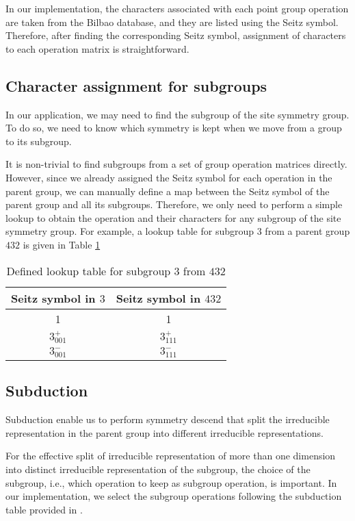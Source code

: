 \documentclass{article}
\begin{document}
In our implementation, the characters associated with each point group operation are taken from the Bilbao database, and 
they are listed using the Seitz symbol. Therefore, after finding the corresponding Seitz symbol, assignment of characters to 
each operation matrix is straightforward.


\subsection{Character assignment for subgroups}

In our application, we may need to find the subgroup of the site symmetry group. 
To do so, we need to know which symmetry is kept when we move from a group to its subgroup. 

It is non-trivial to find subgroups from a set of group operation matrices directly. However, since we 
already assigned the Seitz symbol for each operation in the parent group, we can manually define a 
map between the Seitz symbol of the parent group and all its subgroups. Therefore, we only need 
to perform a simple lookup to obtain the operation and their characters for any subgroup of the site symmetry group. 
For example, a lookup table for subgroup $3$ from a parent group $432$ is given in Table \ref{T:subgrouplookup}

\begin{table}[h]
    \centering
    \caption{Defined lookup table for subgroup $3$ from $432$}
    \begin{tabular}{|c|c|}
        \hline
        Seitz symbol in $3$ & Seitz symbol in $432$\\
        \hline
        1 & 1 \\
        $3^{+}_{001}$ & $3^{+}_{111}$ \\
        $3^{-}_{001}$ & $3^{-}_{111}$ \\
        \hline
    \end{tabular}
    \label{T:subgrouplookup}
\end{table}

\subsection{Subduction}
Subduction enable us to perform symmetry descend that split the irreducible representation 
in the parent group into different irreducible representations\cite{johansson_automatic_2017}. 

For the effective split of irreducible representation of more than one dimension into distinct 
irreducible representation of the subgroup, the choice of the subgroup, i.e., which operation 
to keep as subgroup operation, is important. In our implementation, we select the subgroup operations
following the subduction table provided in \cite{altmann_point-group_1994}. 
\end{document}
